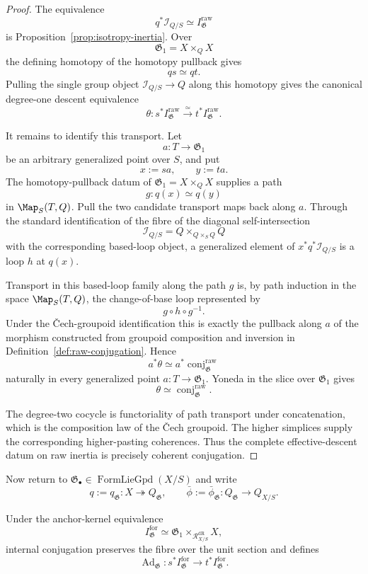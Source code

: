 \begin{proof}
The equivalence
\[
    q^*\mathcal I_{Q/S}
    \simeq
    I^{\mathrm{raw}}_{\mathfrak G}
\]
is Proposition~\ref{prop:isotropy-inertia}.  Over
\[
    \mathfrak G_1=X\times_QX
\]
the defining homotopy of the homotopy pullback gives
\[
    q s\simeq q t.
\]
Pulling the single group object $\mathcal I_{Q/S}\to Q$ along this homotopy
gives the canonical degree-one descent equivalence
\[
    \theta:
    s^*I^{\mathrm{raw}}_{\mathfrak G}
    \xrightarrow{\simeq}
    t^*I^{\mathrm{raw}}_{\mathfrak G}.
\]

It remains to identify this transport.  Let
\[
    a:T\longrightarrow\mathfrak G_1
\]
be an arbitrary generalized point over $S$, and put
\[
    x:=sa,\qquad y:=ta.
\]
The homotopy-pullback datum of
$\mathfrak G_1=X\times_QX$ supplies a path
\[
    g:q(x)\simeq q(y)
\]
in $\Map_S(T,Q)$.  Pull the two candidate transport maps back
along $a$.  Through the standard identification of the fibre of the diagonal
self-intersection
\[
    \mathcal I_{Q/S}
    =
    Q\times_{Q\times_SQ}Q
\]
with the corresponding based-loop object, a generalized element of
$x^*q^*\mathcal I_{Q/S}$ is a loop $h$ at $q(x)$.

Transport in this based-loop family along the path $g$ is, by path induction
in the space $\Map_S(T,Q)$, the change-of-base loop represented
by
\[
    g\circ h\circ g^{-1}.
\]
Under the \v{C}ech-groupoid identification this is exactly the pullback along
$a$ of the morphism constructed from groupoid composition and inversion in
Definition~\ref{def:raw-conjugation}.  Hence
\[
    a^*\theta
    \simeq
    a^*\operatorname{conj}^{\mathrm{raw}}_{\mathfrak G}
\]
naturally in every generalized point $a:T\to\mathfrak G_1$.  Yoneda in the
slice over $\mathfrak G_1$ gives
\[
    \theta
    \simeq
    \operatorname{conj}^{\mathrm{raw}}_{\mathfrak G}.
\]

The degree-two cocycle is functoriality of path transport under concatenation,
which is the composition law of the \v{C}ech groupoid.  The higher simplices
supply the corresponding higher-pasting coherences.  Thus the complete
effective-descent datum on raw inertia is precisely coherent conjugation.
\end{proof}

Now return to
$\mathfrak G_\bullet\in\operatorname{FormLieGpd}(X/S)$ and write
\[
    q:=q_{\mathfrak G}:X\twoheadrightarrow Q_{\mathfrak G},
    \qquad
    \bar\phi:=\bar\phi_{\mathfrak G}:Q_{\mathfrak G}\to Q_{X/S}.
\]

\begin{definition}
\label{def:formal-adjoint-transport}
Under the anchor-kernel equivalence
\[
    I^{\mathrm{for}}_{\mathfrak G}
    \simeq
    \mathfrak G_1\times_{\mathcal R^{\mathrm{dR}}_{X/S}}X,
\]
internal conjugation preserves the fibre over the unit section and defines
\[
    \operatorname{Ad}_{\mathfrak G}:
    s^*I^{\mathrm{for}}_{\mathfrak G}
    \longrightarrow
    t^*I^{\mathrm{for}}_{\mathfrak G}.
\]
\end{definition}

